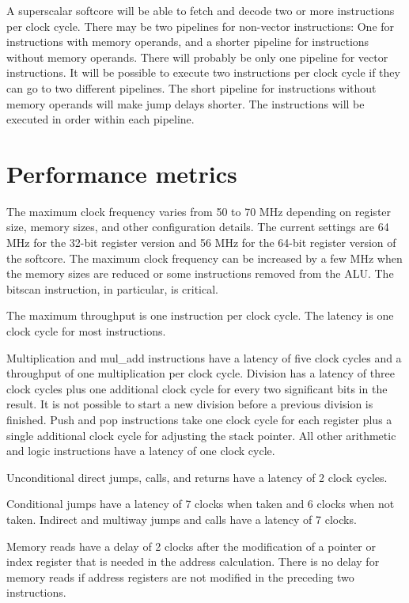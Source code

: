 \documentclass[11pt,a4paper,oneside,openright]{report}
\newcommand{\vv}{ \vspace{2mm} }   %
\begin{document}
A superscalar softcore will be able to fetch and decode two or more instructions per clock cycle. There may be two pipelines for non-vector instructions: One for instructions with memory operands, and a shorter pipeline for instructions without memory operands. There will probably be only one pipeline for vector instructions. It will be possible to execute two instructions per clock cycle if they can go to two different pipelines. The short pipeline for instructions without memory operands will make jump delays shorter. The instructions will be executed in order within each pipeline.
\vv


\section{Performance metrics}
The maximum clock frequency varies from 50 to 70 MHz depending on register size, memory sizes, and other configuration details. The current settings are 64 MHz for the 32-bit register version and 56 MHz for the 64-bit register version of the softcore. The maximum clock frequency can be increased by a few MHz when the memory sizes are reduced or some instructions removed from the ALU. The bitscan instruction, in particular, is critical.
\vv

The maximum throughput is one instruction per clock cycle. The latency is one clock cycle for most instructions. 
\vv

Multiplication and mul\_add instructions have a latency of five clock cycles and a throughput of one multiplication per clock cycle. Division has a latency of three clock cycles plus one additional clock cycle for every two significant bits in the result. It is not possible to start a new division before a previous division is finished. Push and pop instructions take one clock cycle for each register plus a single additional clock cycle for adjusting the stack pointer. All other arithmetic and logic instructions have a latency of one clock cycle.
\vv 

Unconditional direct jumps, calls, and returns have a latency of 2 clock cycles.
\vv

Conditional jumps have a latency of 7 clocks when taken and 6 clocks when not taken. Indirect and multiway jumps and calls have a latency of 7 clocks.
\vv

Memory reads have a delay of 2 clocks after the modification of a pointer or index register that is needed in the address calculation. There is no delay for memory reads if address registers are not modified in the preceding two instructions.
\vv
\end{document}
